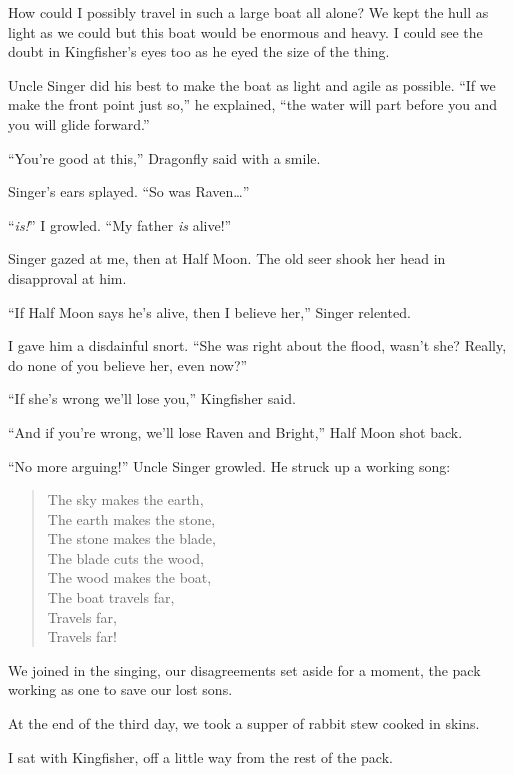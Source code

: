 How could I possibly travel in such a large boat all alone? We kept the hull as light as we could but this boat would be enormous and heavy. I could see the doubt in Kingfisher's eyes too as he eyed the size of the thing.

Uncle Singer did his best to make the boat as light and agile as possible. ``If we make the front point just so,'' he explained, ``the water will part before you and you will glide forward.''

``You're good at this,'' Dragonfly said with a smile.

Singer's ears splayed. ``So was Raven\ldots''

``\emph{is!}'' I growled. ``My father \emph{is} alive!''

Singer gazed at me, then at Half Moon. The old seer shook her head in disapproval at him.

``If Half Moon says he's alive, then I believe her,'' Singer relented.

I gave him a disdainful snort. ``She was right about the flood, wasn't she? Really, do none of you believe her, even now?''

``If she's wrong we'll lose you,'' Kingfisher said.

``And if you're wrong, we'll lose Raven and Bright,'' Half Moon shot back.

``No more arguing!'' Uncle Singer growled. He struck up a working song:
\vspace{-0.4em}

\begin{verse}
The sky makes the earth, \\
The earth makes the stone, \\
The stone makes the blade, \\
The blade cuts the wood, \\
The wood makes the boat, \\
The boat travels far, \\
Travels far, \\
Travels far!
\end{verse}

We joined in the singing, our disagreements set aside for a moment, the pack working as one to save our lost sons.

\secdiv

\noindent At the end of the third day, we took a supper of rabbit stew cooked in skins.

I sat with Kingfisher, off a little way from the rest of the pack.

